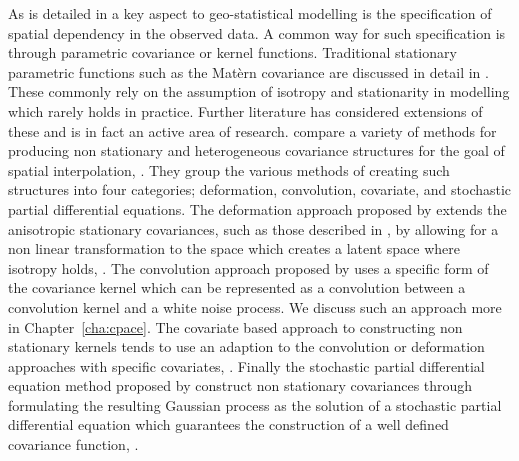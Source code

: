 As is detailed in \cite{cressie_statistics_2010} a key aspect to geo-statistical modelling is the specification of spatial dependency in the observed data.
A common way for such specification is through parametric covariance or kernel functions.
Traditional stationary parametric functions such as the Mat\`{e}rn covariance are discussed in detail in \cite{cressie_statistics_2010}.
These commonly rely on the assumption of isotropy and stationarity in modelling which rarely holds in practice.
Further literature has considered extensions of these and is in fact an active area of research.
\citeauthor{schmidt_flexible_2020} compare a variety of methods for producing non stationary and heterogeneous covariance structures for the goal of spatial interpolation, \citep{schmidt_flexible_2020}.
They group the various methods of creating such structures into four categories; deformation, convolution, covariate, and stochastic partial differential equations.
The deformation approach proposed by \citeauthor{sampson_nonparametric_1992} extends the anisotropic stationary covariances, such as those described in \cite{cressie_statistics_2010}, by allowing for a non linear transformation to the space which creates a latent space where isotropy holds, \cite{sampson_nonparametric_1992}.
The convolution approach proposed by \citeauthor{higdon_space_2002} uses a specific form of the covariance kernel which can be represented as a convolution between a convolution kernel and a white noise process.
We discuss such an approach more in Chapter~\ref{cha:cpace}.
The covariate based approach to constructing non stationary kernels tends to use an adaption to the convolution or deformation approaches with specific covariates, \citep{schmidt_flexible_2020}.
Finally the stochastic partial differential equation method proposed by \citeauthor{lindgren_explicit_2011} construct non stationary covariances through formulating the resulting Gaussian process as the solution of a stochastic partial differential equation which guarantees the construction of a well defined covariance function, \citep{lindgren_explicit_2011}. 


